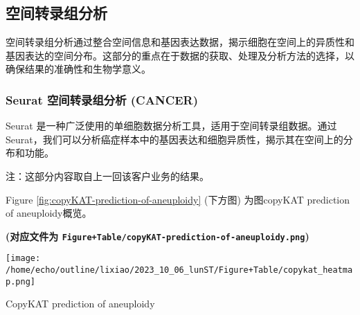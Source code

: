 \documentclass[
]{article}
\begin{document}
\begin{center}\vspace{1.5cm}\end{center}

\hypertarget{ux7a7aux95f4ux8f6cux5f55ux7ec4ux5206ux6790-1}{%
\subsection{空间转录组分析}\label{ux7a7aux95f4ux8f6cux5f55ux7ec4ux5206ux6790-1}}

空间转录组分析通过整合空间信息和基因表达数据，揭示细胞在空间上的异质性和基因表达的空间分布。这部分的重点在于数据的获取、处理及分析方法的选择，以确保结果的准确性和生物学意义。

\hypertarget{seurat-ux7a7aux95f4ux8f6cux5f55ux7ec4ux5206ux6790-cancer}{%
\subsubsection{Seurat 空间转录组分析 (CANCER)}\label{seurat-ux7a7aux95f4ux8f6cux5f55ux7ec4ux5206ux6790-cancer}}

Seurat 是一种广泛使用的单细胞数据分析工具，适用于空间转录组数据。通过 Seurat，我们可以分析癌症样本中的基因表达和细胞异质性，揭示其在空间上的分布和功能。

注：这部分内容取自上一回该客户业务的结果。

\begin{center}\vspace{1.5cm}\end{center}

Figure \ref{fig:copyKAT-prediction-of-aneuploidy} (下方图) 为图copyKAT prediction of aneuploidy概览。

\textbf{(对应文件为 \texttt{Figure+Table/copyKAT-prediction-of-aneuploidy.png})}

\def\@captype{figure}
\begin{center}
\texttt{[image: /home/echo/outline/lixiao/2023\_10\_06\_lunST/Figure+Table/copykat\_heatmap.png]}
\caption{CopyKAT prediction of aneuploidy}\label{fig:copyKAT-prediction-of-aneuploidy}
\end{center}

\begin{center}\vspace{1.5cm}\end{center}
\end{document}

